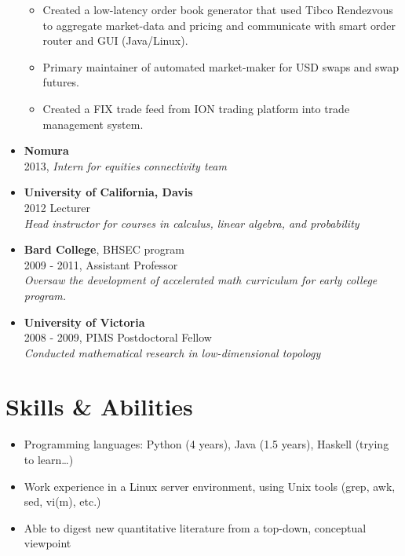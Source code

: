 \documentclass[margin]{res}
\def\tightlist{}
\begin{document}
\begin{resume}
\begin{itemize}
  \begin{itemize}
  \tightlist
  \item
    Created a low-latency order book generator that used Tibco
    Rendezvous to aggregate market-data and pricing and communicate with
    smart order router and GUI (Java/Linux).
  \item
    Primary maintainer of automated market-maker for USD swaps and swap
    futures.
  \item
    Created a FIX trade feed from ION trading platform into trade
    management system.
  \end{itemize}
\item
  \textbf{Nomura}\\
  2013, \emph{Intern for equities connectivity team}
\item
  \textbf{University of California, Davis}\\
  2012 Lecturer\\
  \emph{Head instructor for courses in calculus, linear algebra, and
  probability}
\item
  \textbf{Bard College}, BHSEC program\\
  2009 - 2011, Assistant Professor\\
  \emph{Oversaw the development of accelerated math curriculum for early
  college program.}
\item
  \textbf{University of Victoria}\\
  2008 - 2009, PIMS Postdoctoral Fellow\\
  \emph{Conducted mathematical research in low-dimensional topology}
\end{itemize}

\hypertarget{skills-abilities}{%
\section{Skills \& Abilities}\label{skills-abilities}}

\begin{itemize}
\tightlist
\item
  Programming languages: {Python} (4 years), {Java} (1.5 years),
  {Haskell} (trying to learn\ldots{})
\item
  Work experience in a Linux server environment, using Unix tools (grep,
  awk, sed, vi(m), etc.)
\item
  Able to digest new quantitative literature from a top-down, conceptual
  viewpoint
\end{itemize}

\hypertarget{papers}{%
}
\end{resume}
\end{document}
